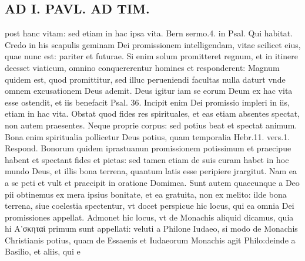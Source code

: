 \documentclass{article}
\begin{document}
\begin{pages}
\section*{AD I. PAVL. AD TIM. }
\marginpar{[ p.212 ]}\pstart post hanc vitam: sed etiam in hac ipsa vita. Bern sermo.4. in Psal. Qui habitat. Credo in his scapulis geminam Dei promissionem intelligendam, vitae scilicet eius, quae nunc est: pariter et futurae. Si enim solum promitteret regnum, et in itinere deesset viaticum, omnino conquererentur homines et responderent: Magnum quidem est, quod promittitur, sed illuc perueniendi facultas nulla daturt vnde omnem excusationem Deus ademit. Deus igitur iam se eorum Deum ex hac vita esse ostendit, et iis benefacit Psal. 36. Incipit enim Dei promissio impleri in iis, etiam in hac vita.  \pend\pstart Obstat quod fides res spirituales, et eas etiam absentes spectat, non autem praesentes. Neque proprie corpus: sed potius beat et spectat animum. Bona enim spiritualia pollicetur Deus potius, quam temporalia Hebr.11. vers.1. Respond. Bonorum quidem iprastuanun promissionem potissimum et praecipue habent et spectant fides et pietas: sed tamen etiam de suis curam habet in hoc mundo Deus, et illis bona terrena, quantum latis esse peripiere jrargitut. Nam ea a se peti et vult et praecipit in oratione Domimca.  \pend\pstart Sunt autem quaecunque a Deo pii obtinemus ex mera ipsius bonitate, et ea gratuita, non ex melito: ilde bona terrena, siue coelestia spectentur, vt docet perspicue hic locus, qui ea omnia Dei promissiones appellat.  \pend\pstart Admonet hic locus, vt de Monachis aliquid dicamus, quia hi Α’σκηταὶ primum sunt appellati: veluti a Philone Iudaeo, si modo de Monachis Christianis potius, quam de Essaenis et Iudaeorum Monachis agit Philo:deinde a Basilio, et aliis, qui e\pend

\end{pages}
\end{document}
